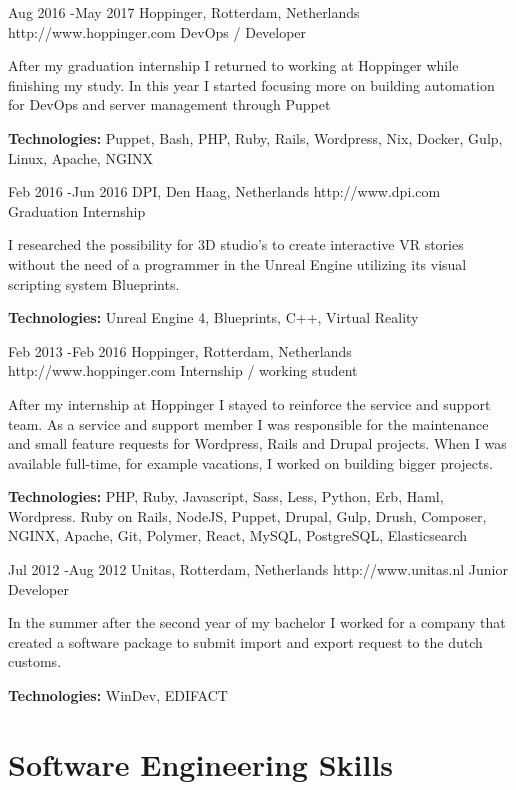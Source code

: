\documentclass[10pt]{article} %
\begin{document}
\job
{Aug 2016 -}{May 2017}
{Hoppinger, Rotterdam, Netherlands}
{http://www.hoppinger.com}
{DevOps / Developer}
{After my graduation internship I returned to working at Hoppinger while finishing my study. In this year I started focusing more on building automation for DevOps and server management through Puppet

\rule{0mm}{5mm}\textbf{Technologies:} Puppet, Bash, PHP, Ruby, Rails, Wordpress, Nix, Docker, Gulp, Linux, Apache, NGINX }

\job
{Feb 2016 -}{Jun 2016}
{DPI, Den Haag, Netherlands}
{http://www.dpi.com}
{Graduation Internship}
{I researched the possibility for 3D studio's to create interactive VR stories without the need of a programmer in the Unreal Engine utilizing its visual scripting system Blueprints.\\
\rule{0mm}{5mm}\textbf{Technologies:} Unreal Engine 4, Blueprints, C++, Virtual Reality}

\job
{Feb 2013 -}{Feb 2016}
{Hoppinger, Rotterdam, Netherlands}
{http://www.hoppinger.com}
{Internship / working student}
{After my internship at Hoppinger I stayed to reinforce the service and support team. As a service and support member I was responsible for the maintenance and small feature requests for Wordpress, Rails and Drupal projects. When I was available full-time, for example vacations, I worked on building bigger projects.

\rule{0mm}{5mm}\textbf{Technologies:} PHP, Ruby, Javascript, Sass, Less, Python, Erb, Haml, Wordpress. Ruby on Rails, NodeJS, Puppet, Drupal, Gulp, Drush, Composer, NGINX, Apache, Git, Polymer, React, MySQL, PostgreSQL, Elasticsearch
}

\job
{Jul 2012 -}{Aug 2012}
{Unitas, Rotterdam, Netherlands}
{http://www.unitas.nl}
{Junior Developer}
{In the summer after the second year of my bachelor I worked for a company that created a software package to submit import and export request to the dutch customs.

\rule{0mm}{5mm}\textbf{Technologies:} WinDev, EDIFACT
}


\section{Software Engineering Skills}
\end{document}
